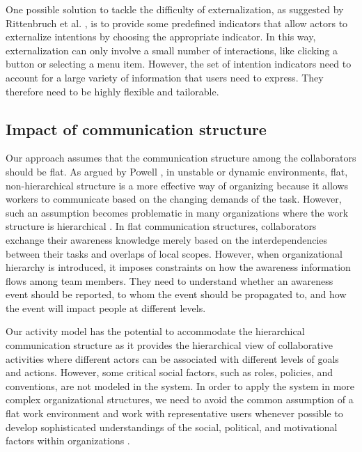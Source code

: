 One possible solution to tackle the difficulty of externalization, as suggested by Rittenbruch et al. \cite{Rittenbruch2007}, is to provide some predefined indicators that allow actors to externalize intentions by choosing the appropriate indicator. In this way, externalization can only involve a small number of interactions, like clicking a button or selecting a menu item. However, the set of intention indicators  need to account for a large variety of information that users need to express. They therefore need to be highly flexible and tailorable.

\subsection{Impact of communication structure} %
\label{sub:impact_of_communication_structure}
Our approach assumes that the communication structure among the collaborators should be flat. As argued by Powell \cite{powell2003neither}, in unstable or dynamic environments, flat, non-hierarchical structure is a more effective way of organizing because it allows workers to communicate based on the changing demands of the task. However, such an assumption becomes problematic in many organizations where the work structure is hierarchical \cite{hinds2006structures}. In flat communication structures, collaborators exchange their awareness knowledge merely based on the interdependencies between their tasks and overlaps of local scopes. However, when organizational hierarchy is introduced, it imposes constraints on how the awareness information flows among team members. They need to understand whether an awareness event should be reported, to whom the event should be propagated to, and how the event will impact people at different levels. 

Our activity model has the potential to accommodate the hierarchical communication structure as it provides the hierarchical view of collaborative activities where different actors can be associated with different levels of goals and actions. However, some critical social factors, such as roles, policies, and conventions, are not modeled in the system. In order to apply the system in more complex organizational structures,  we need to avoid the common assumption of a flat work environment and work with representative users whenever possible to develop sophisticated understandings of the social, political, and motivational factors within organizations \cite{Grudin1994}.




 

